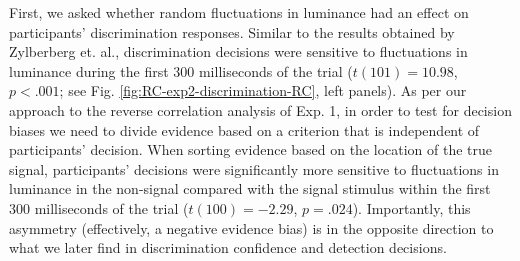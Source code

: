 \documentclass[12pt,twoside]{reedthesis}
\begin{document}
First, we asked whether random fluctuations in luminance had an effect on participants' discrimination responses. Similar to the results obtained by Zylberberg et. al., discrimination decisions were sensitive to fluctuations in luminance during the first 300 milliseconds of the trial (\(t(101) = 10.98\), \(p < .001\); see Fig. \ref{fig:RC-exp2-discrimination-RC}, left panels). As per our approach to the reverse correlation analysis of Exp. 1, in order to test for decision biases we need to divide evidence based on a criterion that is independent of participants' decision. When sorting evidence based on the location of the true signal, participants' decisions were significantly more sensitive to fluctuations in luminance in the non-signal compared with the signal stimulus within the first 300 milliseconds of the trial (\(t(100) = -2.29\), \(p = .024\)). Importantly, this asymmetry (effectively, a negative evidence bias) is in the opposite direction to what we later find in discrimination confidence and detection decisions.
\end{document}
